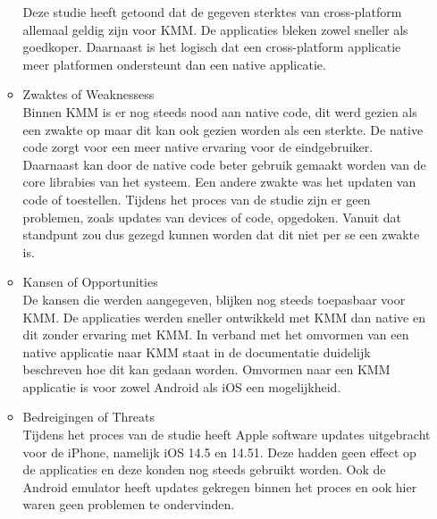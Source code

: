 \begin{itemize}
\begin{itemize}
        Deze studie heeft getoond dat de gegeven sterktes van cross-platform allemaal geldig zijn voor KMM. De applicaties bleken zowel sneller als goedkoper. Daarnaast is het logisch dat een cross-platform applicatie meer platformen ondersteunt dan een native applicatie.
        \\
        \item Zwaktes of Weaknessess\\
        Binnen KMM is er nog steeds nood aan native code, dit werd gezien als een zwakte op maar dit kan ook gezien worden als een sterkte. De native code zorgt voor een meer native ervaring voor de eindgebruiker. Daarnaast kan door de native code beter gebruik gemaakt worden van de core librabies van het systeem. Een andere zwakte was het updaten van code of toestellen. Tijdens het proces van de studie zijn er geen problemen, zoals updates van devices of code, opgedoken. Vanuit dat standpunt zou dus gezegd kunnen worden dat dit niet per se een zwakte is.
        \\
        \item Kansen of Opportunities\\
        De kansen die werden aangegeven, blijken nog steeds toepasbaar voor KMM. De applicaties werden sneller ontwikkeld met KMM dan native en dit zonder ervaring met KMM. In verband met het omvormen van een native applicatie naar KMM staat in de documentatie duidelijk beschreven hoe dit kan gedaan worden. Omvormen naar een KMM applicatie is voor zowel Android als iOS een mogelijkheid.
        \\
        \item Bedreigingen of Threats\\
        Tijdens het proces van de studie heeft Apple software updates uitgebracht voor de iPhone, namelijk iOS 14.5 en 14.51. Deze hadden geen effect op de applicaties en deze konden nog steeds gebruikt worden. Ook de Android emulator heeft updates gekregen binnen het proces en ook hier waren geen problemen te ondervinden.
    \end{itemize}
\end{itemize}

